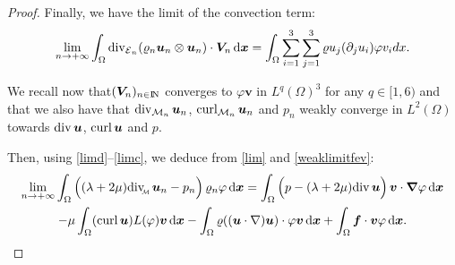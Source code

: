 \documentclass{amsart}
\numberwithin{equation}{section}
\begin{document}
\begin{proof}
Finally, we have the limit of the convection term:
\begin{equation}
\lim_{{n {\rightarrow} + \infty}} \int_\Omega \operatorname{div}_{\operatorname{{\mathcal{E}}}_n}({\varrho}_n {{\boldsymbol u}}_n \otimes {{\boldsymbol u}}_n) \cdot {\bm{V}}_n {\, {\rm d}{{\boldsymbol x}}} = \int_\Omega \sum_{i=1}^3
 \sum_{j=1}^3 {\varrho} u_j (\partial_j u_i) {\varphi} v_i dx.
\label{weaklimitfev}
\end{equation}

\medskip
We recall now that$({\bm{V}}_n)_{{n \in {\ifmmode{\rm	I\mkern-3.1mu
N\mkern0.5mu}\else{\rm I\kern-.16em
N\hskip0.5pt\ }\fi\relax}}} $ converges to $ \varphi {\bm{v}} $ in $ L^q(\Omega)^3 $ for any $ q \in [1,6)$
and that we also have that ${{\rm div}}_{{{\mathcal M}}_n} \, {{\boldsymbol u}}_n$, ${{\rm curl}}_{{{\mathcal M}}_n} \, {{\boldsymbol u}}_n$ and $p_n$ weakly converge in $L^2(\Omega)$ towards ${{\rm div}}\, {{\boldsymbol u}}$, ${{\rm curl}} \, {{\boldsymbol u}}$ and $p$.

Then, using \eqref{limd}--\eqref{limc}, we deduce from \eqref{lim} and \eqref{weaklimitfev}:
\begin{multline*}
\lim_{{n {\rightarrow} + \infty}} \int_\Omega \Big( (\lambda+2\mu){{\rm div}_{\hspace{-0.2em}\raisebox{-0.1em}{\scalebox{0.5}{${{\mathcal M}}$}}}} \, {{\boldsymbol u}}_n-p_n\Big)\,{\varrho}_n \varphi {\, {\rm d}{{\boldsymbol x}}} = \int_\Omega  \Big(p-(\lambda+2\mu){{\rm div}} \, {{\boldsymbol u}}\Big)\, {{\boldsymbol v}} \cdot {{\boldsymbol \nabla}} \varphi {\, {\rm d}{{\boldsymbol x}}} \\  - \mu \int_\Omega  ({{\rm curl}} \, {{\boldsymbol u}})L(\varphi) {{\boldsymbol v}} {\, {\rm d}{{\boldsymbol x}}} -\int_\Omega {\varrho}( ({{\boldsymbol u}} \cdot \nabla) {{\boldsymbol u}})\cdot \varphi {{\boldsymbol v}} {\, {\rm d}{{\boldsymbol x}}} + \int_\Omega {{\boldsymbol f}}\cdot {{\boldsymbol v}} \varphi  {\, {\rm d}{{\boldsymbol x}}}.
\end{multline*}


\end{proof}
\end{document}
